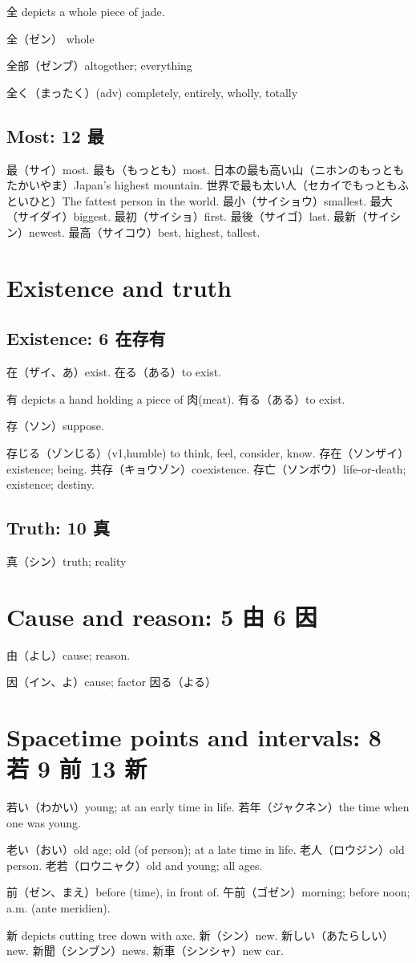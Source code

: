 全 depicts a whole piece of jade.

全（ゼン） whole

全部（ゼンブ）altogether; everything

全く（まったく）(adv) completely, entirely, wholly, totally

\subsection{Most: 12 最}

最（サイ）most.
最も（もっとも）most.
日本の最も高い山（ニホンのもっともたかいやま）Japan's highest mountain.
世界で最も太い人（セカイでもっともふといひと）The fattest person in the world.
最小（サイショウ）smallest.
最大（サイダイ）biggest.
最初（サイショ）first.
最後（サイゴ）last.
最新（サイシン）newest.
最高（サイコウ）best, highest, tallest.

\section{Existence and truth}

\subsection{Existence: 6 在存有}

在（ザイ、あ）exist.
在る（ある）to exist.

有 depicts a hand holding a piece of 肉(meat).
有る（ある）to exist.

存（ソン）suppose.

存じる（ゾンじる）(v1,humble) to think, feel, consider, know.
存在（ソンザイ）existence; being.
共存（キョウゾン）coexistence.
存亡（ソンボウ）life-or-death; existence; destiny.

\subsection{Truth: 10 真}

真（シン）truth; reality

\section{Cause and reason: 5 由 6 因}

由（よし）cause; reason.

因（イン、よ）cause; factor
因る（よる）

\section{Spacetime points and intervals: 8 若 9 前 13 新}

若い（わかい）young; at an early time in life.
若年（ジャクネン）the time when one was young.

老い（おい）old age; old (of person); at a late time in life.
老人（ロウジン）old person.
老若（ロウニャク）old and young; all ages.

前（ゼン、まえ）before (time), in front of.
午前（ゴゼン）morning; before noon; a.m. (ante meridien).

新 depicts cutting tree down with axe.
新（シン）new.
新しい（あたらしい）new.
新聞（シンブン）news.
新車（シンシャ）new car.
